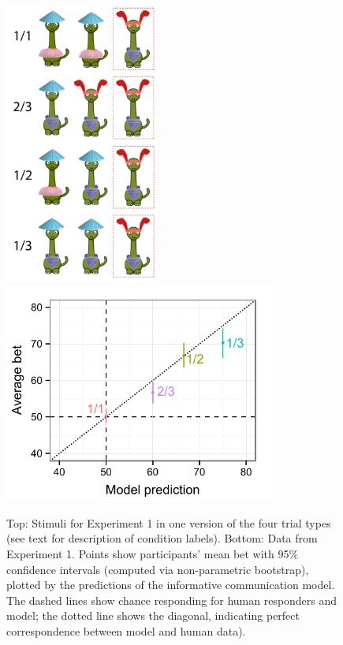 \documentclass[review]{elsarticle}
\begin{document}
\begin{figure}
\begin{center}
\includegraphics[width=2in]{stims_complex.pdf}
\includegraphics[width=3.5in]{info_adults_lm_mod.pdf}
\caption{\label{fig:adults} Top: Stimuli for Experiment 1 in one version of the four trial types (see text for description of condition labels). Bottom: Data from Experiment 1. Points show participants' mean bet with 95\% confidence intervals (computed via non-parametric bootstrap), plotted by the predictions of the informative communication model. The dashed lines show chance responding for human responders and model; the dotted line shows the diagonal, indicating perfect correspondence between model and human data).}
\end{center}
\end{figure}
\end{document}
